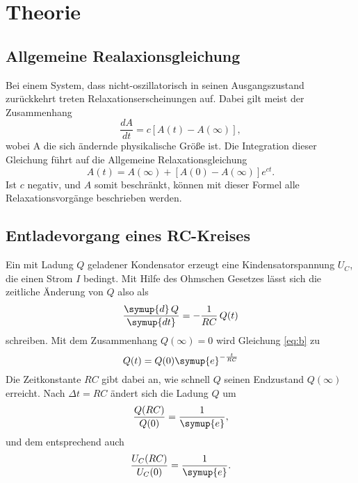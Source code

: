 \section{Theorie}
\label{sec:Theorie}
\subsection{Allgemeine Realaxionsgleichung}
Bei einem System, dass nicht-oszillatorisch in seinen
Ausgangszustand zurückkehrt treten Relaxationserscheinungen
auf. Dabei gilt meist der Zusammenhang
\begin{equation}
    \frac{dA}{dt}=c[A(t)-A(\infty)],
\end{equation}
\noindent wobei A die sich ändernde physikalische Größe ist.
Die Integration dieser Gleichung führt auf die Allgemeine
Relaxationsgleichung
\begin{equation}
    A(t)=A(\infty)+[A(0)-A(\infty)]e^{ct}.
    \label{eq:b}
\end{equation}
\noindent Ist $c$ negativ, und $A$ somit beschränkt,
können mit dieser Formel alle Relaxationsvorgänge beschrieben werden.
\subsection{Entladevorgang eines RC-Kreises}
Ein mit Ladung $Q$ geladener Kondensator erzeugt eine
Kindensatorspannung $U_C$, die einen Strom $I$ bedingt.
Mit Hilfe des Ohmschen Gesetzes lässt sich die
zeitliche Änderung von $Q$ also als
\begin{equation}
    \frac{{\symup{d}\,Q}}{\symup{dt}}=-\frac{1}{RC}\,Q(t)
\end{equation}
schreiben. Mit dem Zusammenhang $Q(\infty) =0$ wird
Gleichung \ref{eq:b} zu
\begin{equation}
    Q(t)=Q(0)\symup{e}^{-\frac{t}{RC}}
\end{equation}
\noindent Die Zeitkonstante $RC$ gibt dabei an, wie
schnell $Q$ seinen Endzustand $Q(\infty)$ erreicht.
Nach $\Delta t=RC$ ändert sich die Ladung $Q$ um
\begin{equation}
    \frac{Q(RC)}{Q(0)}=\frac{1}{\symup{e}},
\end{equation}
\noindent und dem entsprechend auch
\begin{equation}
    \frac{U_C(RC)}{U_C(0)}=\frac{1}{\symup{e}}.
\end{equation}

